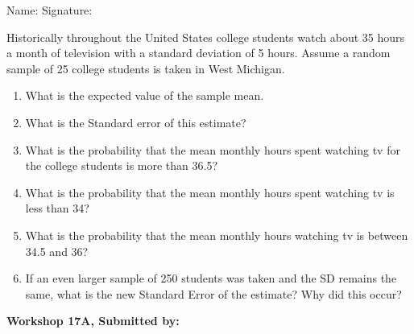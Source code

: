 \documentclass[11pt, chapterprefix=true]{scrbook}\usepackage[]{graphicx}\usepackage[]{color}
\begin{document}
\begin{exercises}
\begin{exercise}
\begin{center}
{{\vspace{4mm}
Name: \underline{\phantom{xxxxxxxxxxxxxxxxxxxxxxxx}} Signature: \underline{\phantom{xxxxxxxxxxxxxxxxxxxxxxxx}}
 }}
\end{center}

Historically throughout the United States college students watch about 35 hours a month of television with a standard deviation of 5 hours. Assume a random sample of 25 college students is taken in West Michigan.

\begin{enumerate}
\item  What is the expected value of the sample mean.
\item  What is the Standard error of this estimate?
\item  What is the probability that the mean monthly hours spent watching tv for the college students is more than 36.5?
\item  What is the probability that the mean monthly hours spent watching tv is less than 34?
\item  What is the probability that the mean monthly hours watching tv is between 34.5 and 36?
\item  If an even larger sample of 250 students was taken and the SD remains the same, what is the new Standard Error of the estimate?  Why did this occur?
\end{enumerate}

\end{exercise}
\begin{solution}  %

\end{solution}


\clearpage

    \begin{exercise}  %

    \begin{center}
\begin{flushleft}\textbf{\large \hfill Workshop 17A, Submitted by: }\end{flushleft}

\end{center}
\end{exercise}
\end{exercises}
\end{document}
